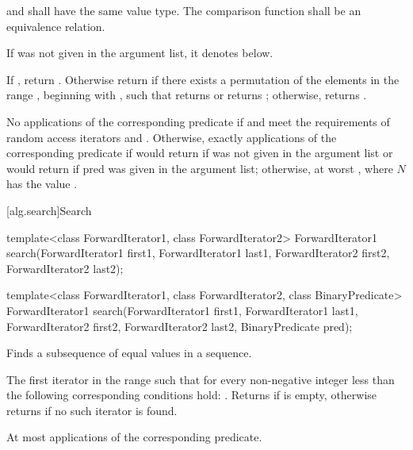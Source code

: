 \begin{itemdescr}
\pnum
\requires {} and  shall have the same
value type. The comparison function shall be an equivalence relation.

\pnum
\remarks If  was not given in the argument list, it denotes
 below.

\pnum
\returns If , return .
Otherwise return  if there exists a permutation of the elements in the
range , beginning with , such that  returns  or 
 returns ; otherwise, returns
.

\pnum
\complexity No applications of the corresponding predicate if 
and  meet the requirements of random access iterators and
.
Otherwise, exactly  applications of the
corresponding predicate if 
would return  if  was not given in the argument list
or  would return  if pred was given in the argument list; otherwise, at
worst , where $N$ has the value .
\end{itemdescr}

[alg.search]{Search}

%
\begin{itemdecl}
template<class ForwardIterator1, class ForwardIterator2>
  ForwardIterator1
    search(ForwardIterator1 first1, ForwardIterator1 last1,
           ForwardIterator2 first2, ForwardIterator2 last2);

template<class ForwardIterator1, class ForwardIterator2,
         class BinaryPredicate>
  ForwardIterator1
    search(ForwardIterator1 first1, ForwardIterator1 last1,
           ForwardIterator2 first2, ForwardIterator2 last2,
           BinaryPredicate pred);
\end{itemdecl}

\begin{itemdescr}
\pnum
\effects
Finds a subsequence of equal values in a sequence.

\pnum
\returns
The first iterator
in the range 
such that for every non-negative integer
less than
the following corresponding conditions hold:
.
Returns 
if  is empty,
otherwise returns 
if no such iterator is found.

\pnum
\complexity
At most
applications of the corresponding predicate.
\end{itemdescr}

